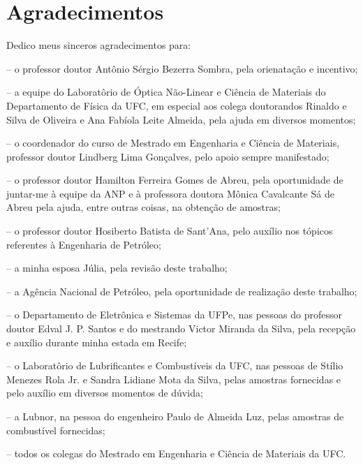 

\chapter*{Agradecimentos}



Dedico meus sinceros agradecimentos para:

-- o professor doutor Antônio Sérgio Bezerra Sombra, pela orienatação e incentivo;

-- a equipe do Laboratôrio de Óptica Não-Linear e Ciência de Materiais do Departamento de Física da UFC, em especial aos colega doutorandos Rinaldo e Silva de Oliveira e Ana Fabíola Leite Almeida, pela ajuda em diversos momentos;

-- o coordenador do curso de Mestrado em Engenharia e Ciência de Materiais, professor doutor Lindberg Lima Gonçalves, pelo apoio sempre manifestado;

-- o professor doutor Hamilton Ferreira Gomes de Abreu, pela oportunidade de juntar-me à equipe da ANP e à professora doutora Mônica Cavalcante Sá de Abreu pela ajuda, entre outras coisas, na obtenção de amostras;

-- o professor doutor Hosiberto Batista de Sant'Ana, pelo auxílio nos tópicos referentes à Engenharia de Petróleo;

-- a minha esposa Júlia, pela revisão deste trabalho;

-- a Agência Nacional de Petróleo, pela oportunidade de realização deste trabalho;

-- o Departamento de Eletrônica e Sistemas da UFPe, nas pessoas do professor doutor Edval J. P. Santos e do mestrando Victor Miranda da Silva, pela recepção e auxílio durante minha estada em Recife;

-- o Laboratôrio de Lubrificantes e Combustíveis da UFC, nas pessoas de Stílio Menezes Rola Jr. e Sandra Lidiane Mota da Silva, pelas amostras fornecidas e pelo auxílio em diversos momentos de dúvida;

-- a Lubnor, na pessoa do engenheiro Paulo de Almeida Luz, pelas amostras de combustível fornecidas;

-- todos os colegas do Mestrado em Engenharia e Ciência de Materiais da UFC.
